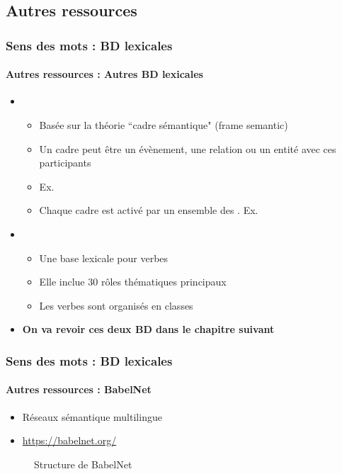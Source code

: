 \documentclass[xcolor=table]{beamer}
\begin{document}
\subsection{Autres ressources}

\begin{frame}
\frametitle{Sens des mots : BD lexicales}
\framesubtitle{Autres ressources : Autres BD lexicales}
	
\begin{itemize}
	\item {} 
	\begin{itemize}
		\item Basée sur la théorie ``cadre sémantique" (frame semantic)
		\item Un cadre peut être un évènement, une relation ou un entité avec ces participants 
		\item Ex. 
		\item Chaque cadre est activé par un ensemble des . Ex. 
	\end{itemize}
	\item {} 
	\begin{itemize}
		\item Une base lexicale pour verbes
		\item Elle inclue 30 rôles thématiques principaux 
		\item Les verbes sont organisés en classes
	\end{itemize}
	\item \textbf{On va revoir ces deux BD dans le chapitre suivant}
\end{itemize}
	
\end{frame}

\begin{frame}
\frametitle{Sens des mots : BD lexicales}
\framesubtitle{Autres ressources : BabelNet}

\begin{itemize}
	\item Réseaux sémantique multilingue
	\item \url{https://babelnet.org/}
\end{itemize}

\begin{figure}
	\caption{Structure de BabelNet \cite{2012-navigli-ponzetto}}
\end{figure}
	
\end{frame}
\end{document}
